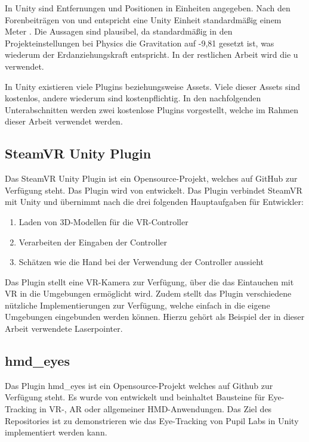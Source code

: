 In Unity sind Entfernungen und Positionen in Einheiten angegeben. Nach den Forenbeiträgen von \citeauthor{BrentAllard.2017} und \citeauthor{AVividLight.2010} entspricht eine Unity Einheit standardmäßig einem Meter \cite{BrentAllard.2017, AVividLight.2010}. Die Aussagen sind plausibel, da standardmäßig in den Projekteinstellungen bei Physics die Gravitation auf -9,81 gesetzt ist, was wiederum der Erdanziehungskraft entspricht. In der restlichen Arbeit wird die \ac{u} verwendet.

In Unity existieren viele Plugins beziehungsweise Assets. Viele dieser Assets sind kostenlos, andere wiederum sind kostenpflichtig. In den nachfolgenden Unterabschnitten werden zwei kostenlose Plugins vorgestellt, welche im Rahmen dieser Arbeit verwendet werden.

\subsection{SteamVR Unity Plugin}
Das SteamVR Unity Plugin ist ein Opensource-Projekt, welches auf GitHub zur Verfügung steht. Das Plugin wird von \citeauthor{ValveSW.2020} entwickelt. \cite{ValveSW.2020} Das Plugin verbindet SteamVR mit Unity und übernimmt nach \citeauthor{ValveSW.2019} die drei folgenden Hauptaufgaben für Entwickler: \cite{ValveSW.2019} 

\begin{enumerate}
	\item Laden von 3D-Modellen für die \ac{VR}-Controller
	\item Verarbeiten der Eingaben der Controller
	\item Schätzen wie die Hand bei der Verwendung der Controller aussieht
\end{enumerate}

Das Plugin stellt eine \ac{VR}-Kamera zur Verfügung, über die das Eintauchen mit \ac{VR} in die Umgebungen ermöglicht wird. Zudem stellt das Plugin verschiedene nützliche Implementierungen zur Verfügung, welche einfach in die eigene Umgebungen eingebunden werden können. Hierzu gehört als Beispiel der in dieser Arbeit verwendete Laserpointer. 

\subsection{hmd\_eyes}
Das Plugin hmd\_eyes ist ein Opensource-Projekt welches auf Github zur Verfügung steht. Es wurde von \citeauthor{hmd-eyes.2020} entwickelt und beinhaltet Bausteine für Eye-Tracking in \ac{VR}-, \ac{AR} oder allgemeiner \ac{HMD}-Anwendungen. Das Ziel des Repositories ist zu demonstrieren wie das Eye-Tracking von Pupil Labs in Unity implementiert werden kann. \cite{hmd-eyes.2020} 


